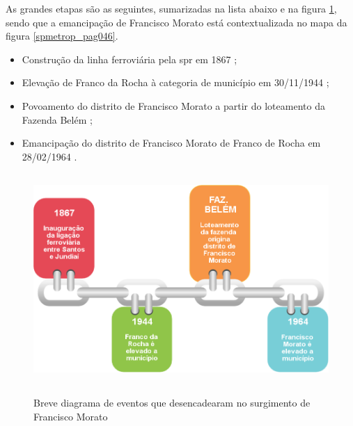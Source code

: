 	As grandes etapas são as seguintes, sumarizadas na lista abaixo e na figura \ref{fig:timeline}, sendo que a emancipação de Francisco Morato está contextualizada no mapa da figura \ref{spmetrop_pag046}.
	
	\begin{itemize}
		\item Construção da linha ferroviária pela \gls{spr} em 1867 \cite[p.26]{ferreira2010a};
		\item Elevação de Franco da Rocha à categoria de município em 30/11/1944 \cite{ibge2018a};
		\item Povoamento do distrito de Francisco Morato a partir do loteamento da Fazenda Belém \cite[p.57]{cassiele2007a};
		\item Emancipação do distrito de Francisco Morato de Franco de Rocha em 28/02/1964 \cite[p.57]{cassiele2007a}.
	\end{itemize}
	
	\begin{figure}[H]
		\centering
		\caption[Diagrama do surgimento de Francisco Morato]{Breve diagrama de eventos que desencadearam no surgimento de Francisco Morato}
		\includegraphics[height=8cm]{img/linha_do_tempo}
		\label{fig:timeline}
	\end{figure}
	
